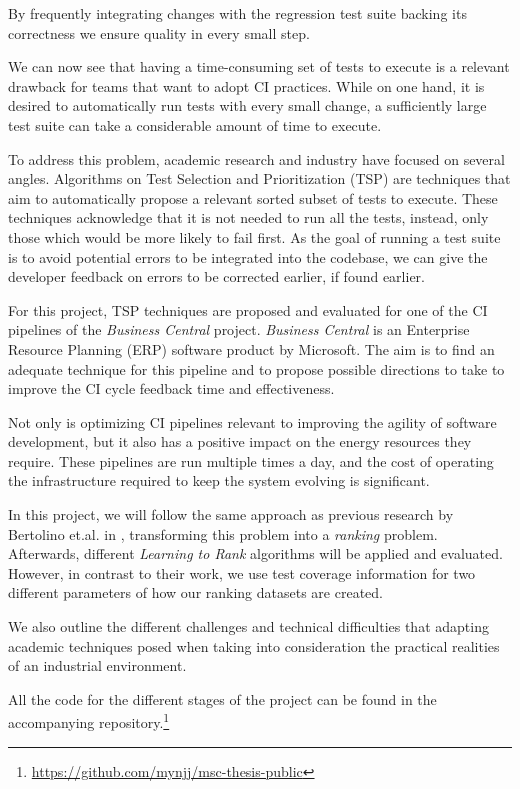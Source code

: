 By frequently integrating changes with the regression test suite backing its correctness
we ensure quality in every small step.

We can now see that having a time-consuming set of tests to execute is a relevant 
drawback for teams that want to adopt CI practices. While on one hand, it is desired
to automatically run tests with every small change, a sufficiently large test suite
can take a considerable amount of time to execute.

To address this problem, academic research and industry have focused on several angles.
Algorithms on Test Selection and Prioritization (TSP) are techniques that aim to 
automatically propose a relevant sorted subset of tests to execute. These techniques
acknowledge that it is not needed to run all the tests, instead, only
those which would be more likely to fail first. As the goal of running a test suite is to
avoid potential errors to be integrated into the codebase, we can give the developer 
feedback on errors to be corrected earlier, if found earlier.

For this project, TSP techniques are proposed and evaluated for one of the CI pipelines
of the \emph{Business Central} project. \emph{Business Central} is an Enterprise Resource Planning (ERP)
software product by Microsoft. The aim is to find an adequate technique
for this pipeline and to propose possible directions to take to improve the
CI cycle feedback time and effectiveness.

Not only is optimizing CI pipelines relevant to improving the agility of software development, 
but it also has a positive impact on the energy resources they require.
These pipelines are run multiple times a day, and the cost of operating the infrastructure
required to keep the system evolving is significant.

In this project, we will follow the same approach as previous research by Bertolino
et.al. in \cite{Bertolino2020LearningtoRankVR}, transforming this problem into a \emph{ranking} problem.
Afterwards, different \emph{Learning to Rank} algorithms will be applied and evaluated.
However, in contrast to their work, we use test coverage information for two different 
parameters of how our ranking datasets are created.

We also outline the different challenges and technical difficulties that adapting
academic techniques posed when taking into consideration the practical realities
of an industrial environment. 

All the code for the different stages of the project can be found 
in the accompanying repository.\footnote{\url{https://github.com/mynjj/msc-thesis-public}}